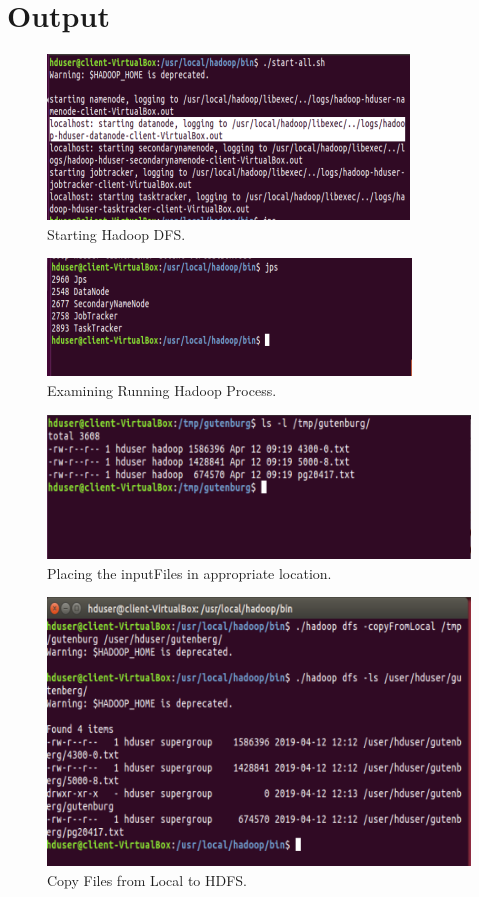 \documentclass[a4paper,10pt]{article}
\begin{document}
\section{Output}
\begin{figure}[h]
	\includegraphics[scale=0.55,center]{exptTwoScreenShot/fig1.png}
	\caption{Starting Hadoop DFS.}
	\label{fig:1}
	
\end{figure}
\begin{figure}[h]
	\includegraphics[scale=0.54,center]{exptTwoScreenShot/fig2.png}
	\caption{Examining Running Hadoop Process.}
	\label{fig:2}
\end{figure}

\begin{figure}[h]
	\includegraphics[scale=0.44,center]{exptTwoScreenShot/fig3.png}
	\caption{Placing the inputFiles in appropriate location.}
	\label{fig:3}
\end{figure}
\newpage

\begin{figure}[h]
	\includegraphics[scale=0.34,center]{exptTwoScreenShot/fig4.png}
	\caption{Copy Files from Local to HDFS.}
	\label{fig:4}
\end{figure}
\end{document}
